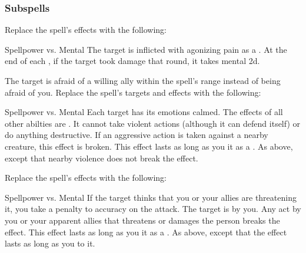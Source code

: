 \subsubsection{Subspells}
Replace the spell's effects with the following:
\begin{spellcontent}
\begin{augmenteffects}
\begin{spellattack}{Spellpower vs. Mental}
\spellsuccess
The target is inflicted with agonizing pain as a .
At the end of each , if the target took damage that round, it takes mental  \minus2d.
\end{spellattack}
\end{augmenteffects}
\end{spellcontent}
The target is afraid of a willing ally within the spell's range instead of being afraid of you.
Replace the spell's targets and effects with the following:
\begin{spellcontent}
\begin{augmenttargetinginfo}
\end{augmenttargetinginfo}
\begin{augmenteffects}
\begin{spellattack}{Spellpower vs. Mental}
\spellsuccess
Each target has its emotions calmed.
The effects of all other  abilties are .
It cannot take violent actions (although it can defend itself) or do anything destructive.
If an aggressive action is taken against a nearby creature, this effect is broken.
This effect lasts as long as you  it as a .
\spellcritical
As above, except that nearby violence does not break the effect.
\end{spellattack}
\end{augmenteffects}
\end{spellcontent}
Replace the spell's effects with the following:
\begin{spellcontent}
\begin{augmenteffects}
\begin{spellattack}{Spellpower vs. Mental}
\spellspecial If the target thinks that you or your allies are threatening it, you take a  penalty to accuracy on the attack.
\spellsuccess
The target is \charmed by you.
Any act by you or your apparent allies that threatens or damages the  person breaks the effect.
This effect lasts as long as you  it as a .
\spellcritical
As above, except that the effect lasts as long as you  to it.
\end{spellattack}
\end{augmenteffects}
\end{spellcontent}
